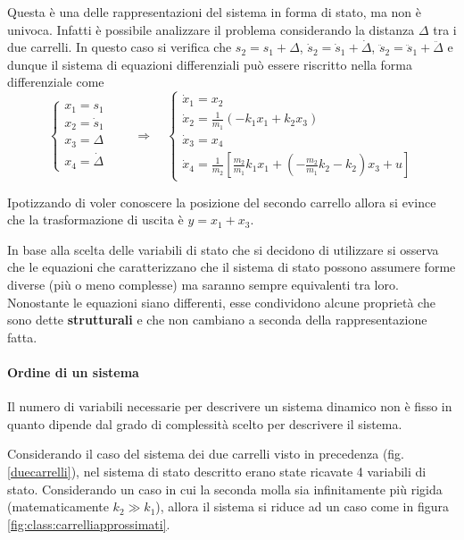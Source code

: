  	Questa è una delle rappresentazioni del sistema in forma di stato, ma non è univoca. Infatti è possibile analizzare il problema considerando la distanza $\Delta$ tra i due carrelli. In questo caso si verifica che $s_2 = s_1+\Delta$, $\dot s_2 = \dot s_1 + \dot \Delta$, $\ddot s_2 = \ddot s_1 +\ddot \Delta$ 	e dunque il sistema di equazioni differenziali può essere riscritto nella forma differenziale come
 	\[ \begin{cases}
 		x_1 = s_1 \\ x_2 = \dot s_1 \\  x_3 = \Delta \\ x_4 =\dot \Delta
 	\end{cases} \qquad \Rightarrow \quad \begin{cases}
 		\dot x_1 = x_2 \\ \dot x_2 = \frac 1 {m_1} \left(-k_1x_1+k_2x_3\right) \\
 		\dot x_3 = x_4 \\ \dot x_4 = \frac{1}{m_2}\left[ \frac{m_2}{m_1}k_1x_1 + \left(-\frac{m_2}{m_1}k_2-k_2\right) x_3 + u \right]
 	\end{cases}\]
 	
 	Ipotizzando di voler conoscere la posizione del secondo carrello allora si evince che la trasformazione di uscita è $y = x_1+x_3$.
 	
 	\vspace{3mm}
 	In base alla scelta delle variabili di stato che si decidono di utilizzare si osserva che le equazioni che caratterizzano che il sistema di stato possono assumere forme diverse (più o meno complesse) ma saranno sempre equivalenti tra loro. Nonostante le equazioni siano differenti, esse condividono alcune proprietà che sono dette \textbf{strutturali} e che non cambiano a seconda della rappresentazione fatta.
 	
 	\paragraph{Ordine di un sistema} Il numero di variabili necessarie per descrivere un sistema dinamico non è fisso in quanto dipende dal grado di complessità scelto per descrivere il sistema.
 	
 	Considerando il caso del sistema dei due carrelli visto in precedenza (fig. \ref{duecarrelli}), nel sistema di stato descritto erano state ricavate 4 variabili di stato. Considerando un caso in cui la seconda molla sia infinitamente più rigida (matematicamente $k_2 \gg k_1$), allora il sistema si riduce ad un caso come in figura \ref{fig:class:carrelliapprossimati}.
 	
